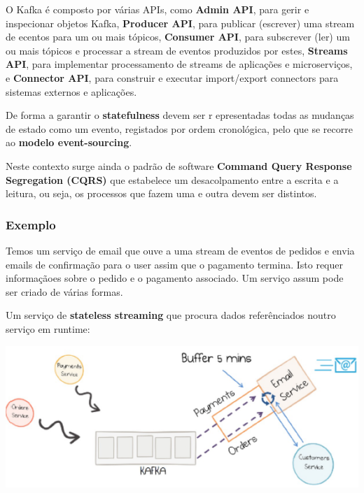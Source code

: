 \documentclass{article}
\begin{document}
O Kafka é composto por várias APIs, como
\textbf{Admin API}, para gerir e inspecionar objetos Kafka,
\textbf{Producer API}, para publicar (escrever) uma stream
de ecentos para um ou mais tópicos, \textbf{Consumer API},
para subscrever (ler) um ou mais tópicos e processar a stream
de eventos produzidos por estes,
\textbf{Streams API}, para implementar processamento
de streams de aplicações e microserviços, e
\textbf{Connector API}, para construir e executar
import/export connectors para sistemas externos e
aplicações.

\vspace{2mm}

De forma a garantir o \textbf{statefulness} devem ser r epresentadas todas
as mudanças de estado como um evento, registados por ordem
cronológica, pelo que se recorre ao \textbf{modelo event-sourcing}.

Neste contexto surge ainda o padrão de software \textbf{Command
Query Response Segregation (CQRS)} que estabelece um
desacolpamento entre a escrita e a leitura, ou seja, os processos
que fazem uma e outra devem ser distintos.

\pagebreak

\subsubsection*{Exemplo}

Temos um serviço de email que ouve a uma stream de eventos
de pedidos e envia emails de confirmação para o user
assim que o pagamento termina. Isto requer informaçãoes sobre
o pedido e o pagamento associado. Um serviço assum pode ser criado de várias formas.

Um serviço de \textbf{stateless streaming} que procura
dados referênciados noutro serviço em runtime:

\begin{center}
  \includegraphics[scale=0.6]{113}
\end{center}
\end{document}
